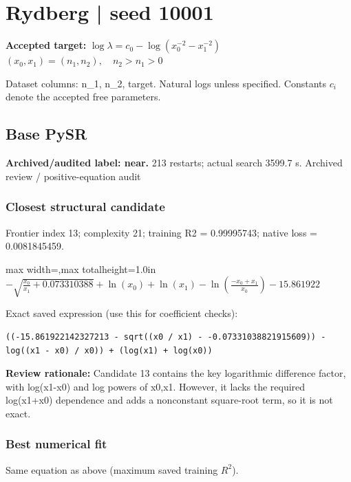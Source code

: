 \documentclass[10pt,letterpaper,landscape]{article}
\begin{document}
\section*{Rydberg | seed 10001}
\textbf{Accepted target:} $\displaystyle \log\lambda=c_0-\log\!\left(x_0^{-2}-x_1^{-2}\right)$\hfill $(x_0,x_1)=(n_1,n_2),\quad n_2>n_1>0$\par
{\small Dataset columns: n\_1, n\_2, target. Natural logs unless specified. Constants $c_i$ denote the accepted free parameters.}\par\medskip
\begin{minipage}[t]{0.485\textwidth}
\subsection*{Base PySR}
\textbf{Archived/audited label: near.} 213 restarts; actual search 3599.7 s.
{\small Archived review / positive-equation audit}
\subsubsection*{Closest structural candidate}
Frontier index 13; complexity 21; training R2 = 0.99995743; native loss = 0.0081845459.
\begin{center}\begin{adjustbox}{max width=\linewidth,max totalheight=1.0in}$\displaystyle - \sqrt{\frac{x_{0}}{x_{1}} + 0.073310388} + \ln{\left(x_{0} \right)} + \ln{\left(x_{1} \right)} - \ln{\left(\frac{- x_{0} + x_{1}}{x_{0}} \right)} - 15.861922$\end{adjustbox}\end{center}
{\scriptsize Exact saved expression (use this for coefficient checks):}
\begin{lstlisting}
((-15.861922142327213 - sqrt((x0 / x1) - -0.07331038821915609)) - log((x1 - x0) / x0)) + (log(x1) + log(x0))
\end{lstlisting}
{\small\textbf{Review rationale:} Candidate 13 contains the key logarithmic difference factor, with log(x1-x0) and log powers of x0,x1. However, it lacks the required log(x1+x0) dependence and adds a nonconstant square-root term, so it is not exact.}
\subsubsection*{Best numerical fit}
Same equation as above (maximum saved training $R^2$).
\end{minipage}\hfill
\end{document}
